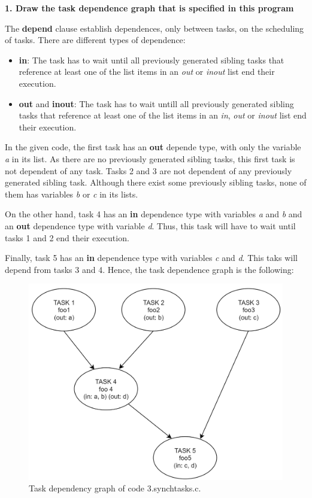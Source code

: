 \documentclass[12pt, a4paper]{article}
\begin{document}
\textbf{1. Draw the task dependence graph that is specified in this program}

The \textbf{depend} clause establish dependences, only between tasks, on the scheduling of tasks. There are different types of dependence:

\begin{itemize}
	\item \textbf{in}: The task has to wait until all previously generated sibling tasks that reference at least one of the list items in an \textit{out} or \textit{inout} list end their execution.
	\item \textbf{out} and \textbf{inout}: The task has to wait untill all previously generated sibling tasks that reference at least one of the list items in an \textit{in}, \textit{out} or \textit{inout} list end their execution.
\end{itemize}

In the given code, the first task has an \textbf{out} depende type, with only the variable \textit{a} in its list. As there are no previously generated sibling tasks, this first task is not dependent of any task. Tasks 2 and 3 are not dependent of any previously generated sibling task. Although there exist some previously sibling tasks, none of them has variables \textit{b} or \textit{c} in its lists.

On the other hand, task 4 has an \textbf{in} dependence type with variables \textit{a} and \textit{b} and an \textbf{out} dependence type with variable \textit{d}. Thus, this task will have to wait until tasks 1 and 2 end their execution.

Finally, task 5 has an \textbf{in} dependence type with variables \textit{c} and \textit{d}. This taks will depend from tasks 3 and 4. Hence, the task dependence graph is the following:

\begin{figure}[H]
  \centering
  \includegraphics[scale=0.5]{./images/synchtasks}
  \caption{Task dependency graph of code 3.synchtasks.c.}
  \label{Task dependency graph of code 3.synchtasks.c.}
\end{figure}
\end{document}
